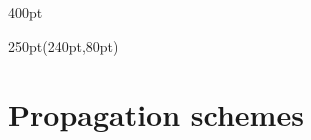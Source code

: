 \begin{frame}
\begin{textblock*}{400pt}
\begin{itemize}
\end{itemize}



\end{textblock*}

\begin{textblock*}{250pt}(240pt,80pt)
\end{textblock*}

\end{frame}






\section{Propagation schemes}


